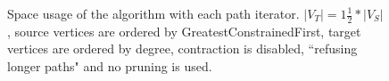 \begin{figure}
    \caption{Space usage of the algorithm with each path iterator. $|V_T|=1\frac{1}{2}*|V_S|$, source vertices are ordered by GreatestConstrainedFirst, target vertices are ordered by degree, contraction is disabled, ``refusing longer paths" and no pruning is used.}
    \label{fig:spaceusage-pathiterators}

\end{figure}
